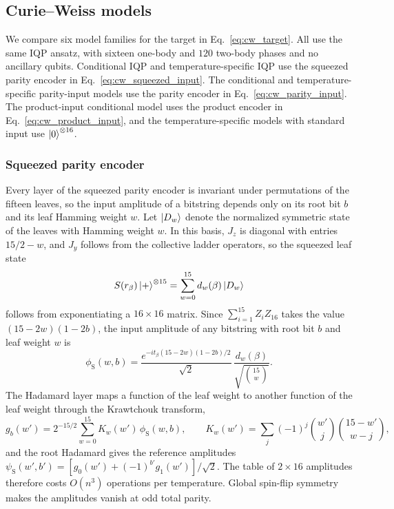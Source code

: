 \documentclass[pra,aps,10pt,twocolumn,floatfix,superscriptaddress, notitlepage,longbibliography]{revtex4-2}
\begin{document}
\subsection{Curie--Weiss models}
\label{sec:appendix_cw}

We compare six model families for the target in Eq.~\eqref{eq:cw_target}. All use the same IQP ansatz, with sixteen one-body and $120$ two-body phases and no ancillary qubits. Conditional IQP and temperature-specific IQP use the squeezed parity encoder in Eq.~\eqref{eq:cw_squeezed_input}. The conditional and temperature-specific parity-input models use the parity encoder in Eq.~\eqref{eq:cw_parity_input}. The product-input conditional model uses the product encoder in Eq.~\eqref{eq:cw_product_input}, and the temperature-specific models with standard input use $\ket{0}^{\otimes16}$.

\subsubsection{Squeezed parity encoder}
\label{sec:appendix_squeezed}

Every layer of the squeezed parity encoder is invariant under permutations of the fifteen leaves, so the input amplitude of a bitstring depends only on its root bit $b$ and its leaf Hamming weight $w$. Let $\ket{D_w}$ denote the normalized symmetric state of the leaves with Hamming weight $w$. In this basis, $J_z$ is diagonal with entries $15/2-w$, and $J_y$ follows from the collective ladder operators, so the squeezed leaf state
\begin{equation}
 S(r_\beta)\ket{+}^{\otimes15}=\sum_{w=0}^{15}d_w(\beta)\ket{D_w}
\end{equation}
follows from exponentiating a $16\times16$ matrix. Since $\sum_{i=1}^{15}Z_iZ_{16}$ takes the value $(15-2w)(1-2b)$, the input amplitude of any bitstring with root bit $b$ and leaf weight $w$ is
\begin{equation}
 \phi_{\mathrm S}(w,b)=\frac{e^{-it_\beta(15-2w)(1-2b)/2}}{\sqrt2}\,\frac{d_w(\beta)}{\sqrt{\binom{15}{w}}}.
\end{equation}
The Hadamard layer maps a function of the leaf weight to another function of the leaf weight through the Krawtchouk transform,
\begin{equation}
 g_b(w')=2^{-15/2}\sum_{w=0}^{15}K_w(w')\,\phi_{\mathrm S}(w,b),\qquad
 K_w(w')=\sum_{j}(-1)^j\binom{w'}{j}\binom{15-w'}{w-j},
\end{equation}
and the root Hadamard gives the reference amplitudes $\psi_{\mathrm S}(w',b')=[g_0(w')+(-1)^{b'}g_1(w')]/\sqrt2$. The table of $2\times16$ amplitudes therefore costs $O(n^3)$ operations per temperature. Global spin-flip symmetry makes the amplitudes vanish at odd total parity.
\end{document}
